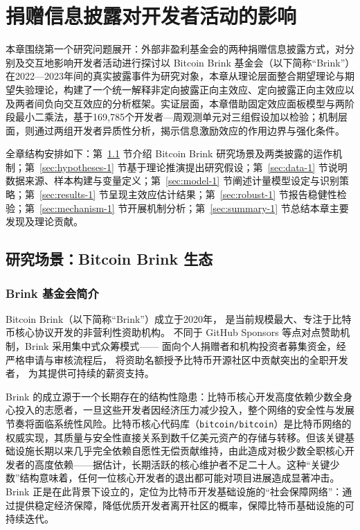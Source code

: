 \chapter{捐赠信息披露对开发者活动的影响}

本章围绕第一个研究问题展开：外部非盈利基金会的两种捐赠信息披露方式，对分别及交互地影响开发者活动进行探讨以 Bitcoin Brink 基金会（以下简称“Brink”）在2022—2023年间的真实披露事件为研究对象，本章从理论层面整合期望理论与期望失验理论，构建了一个统一解释非定向披露正向主效应、定向披露正向主效应以及两者间负向交互效应的分析框架。实证层面，本章借助固定效应面板模型与两阶段最小二乘法，基于169,785个开发者—周观测单元对三组假设加以检验；机制层面，则通过两组开发者异质性分析，揭示信息激励效应的作用边界与强化条件。

全章结构安排如下：第~\ref{sec:research-scene-1} 节介绍 Bitcoin Brink 研究场景及两类披露的运作机制；第~\ref{sec:hypotheses-1} 节基于理论推演提出研究假设；第~\ref{sec:data-1} 节说明数据来源、样本构建与变量定义；第~\ref{sec:model-1} 节阐述计量模型设定与识别策略；第~\ref{sec:results-1} 节呈现主效应估计结果；第~\ref{sec:robust-1} 节报告稳健性检验；第~\ref{sec:mechanism-1} 节开展机制分析；第~\ref{sec:summary-1} 节总结本章主要发现及理论贡献。

\section{研究场景：Bitcoin Brink 生态}
\label{sec:research-scene-1}

\subsection{Brink 基金会简介}

Bitcoin Brink（以下简称“Brink”）成立于2020年，
是当前规模最大、专注于比特币核心协议开发的非营利性资助机构。
不同于 GitHub Sponsors 等点对点赞助机制，Brink 采用集中式众筹模式——
面向个人捐赠者和机构投资者募集资金，经严格申请与审核流程后，
将资助名额授予比特币开源社区中贡献突出的全职开发者，
为其提供可持续的薪资支持。

Brink 的成立源于一个长期存在的结构性隐患：比特币核心开发高度依赖少数全身心投入的志愿者，一旦这些开发者因经济压力减少投入，整个网络的安全性与发展节奏将面临系统性风险。比特币核心代码库（\texttt{bitcoin/bitcoin}）是比特币网络的权威实现，其质量与安全性直接关系到数千亿美元资产的存储与转移。但该关键基础设施长期以来几乎完全依赖自愿性无偿贡献维持，由此造成对极少数全职核心开发者的高度依赖——据估计，长期活跃的核心维护者不足二十人。这种“关键少数”结构意味着，任何一位核心开发者的退出都可能对项目进展造成显著冲击。Brink 正是在此背景下设立的，定位为比特币开发基础设施的“社会保障网络”：通过提供稳定经济保障，降低优质开发者离开社区的概率，保障比特币基础设施的可持续迭代。

